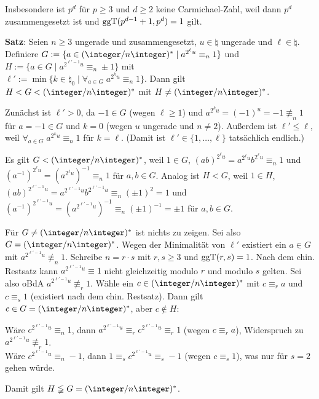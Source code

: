 Insbesondere ist $p^d$ für $p \ge 3$ und $d \ge 2$ keine Carmichael-Zahl, weil dann
$p^d$ zusammengesetzt ist und $\operatorname{ggT}(p^{d-1}+1, p^d) = 1$ gilt.

\linie
\pagebreak

\textbf{Satz}:
Seien $n \ge 3$ ungerade und zusammengesetzt, $u \in \natural$ ungerade und $\ell \in \natural$.\\
Definiere $G := \{a \in (\ZnZ)^\ast \;|\; a^{2^\ell u} \equiv_n 1\}$ und
$H := \{a \in G \;|\; a^{2^{\ell'-1} u} \equiv_n \pm 1\}$ mit\\
$\ell' := \min\{k \in \natural_0 \;|\; \forall_{a \in G}\; a^{2^k u} \equiv_n 1\}$.
Dann gilt $H < G < (\ZnZ)^\ast$ mit $H \not= (\ZnZ)^\ast$.

\begin{Beweis}
    Zunächst ist $\ell' > 0$, da $-1 \in G$ (wegen $\ell \ge 1$)
    und $a^{2^k u} = (-1)^u = -1 \not\equiv_n 1$ für $a = -1 \in G$ und $k = 0$
    (wegen $u$ ungerade und $n \not= 2$).
    Außerdem ist $\ell' \le \ell$, weil $\forall_{a \in G}\; a^{2^k u} \equiv_n 1$ für $k = \ell$.
    (Damit ist $\ell' \in \{1, \dotsc, \ell\}$ tatsächlich endlich.)

    Es gilt $G < (\ZnZ)^\ast$, weil $1 \in G$,
    $(ab)^{2^\ell u} = a^{2^\ell u} b^{2^\ell u} \equiv_n 1$ und
    $(a^{-1})^{2^\ell u} = (a^{2^\ell u})^{-1} \equiv_n 1$ für $a, b \in G$.
    Analog ist $H < G$, weil $1 \in H$,
    $(ab)^{2^{\ell'-1} u} = a^{2^{\ell'-1} u} b^{2^{\ell'-1} u} \equiv_n (\pm 1)^2 = 1$ und
    $(a^{-1})^{2^{\ell'-1} u} = (a^{2^{\ell'-1} u})^{-1} \equiv_n (\pm 1)^{-1} = \pm 1$ für
    $a, b \in G$.

    Für $G \not= (\ZnZ)^\ast$ ist nichts zu zeigen.
    Sei also $G = (\ZnZ)^\ast$.
    Wegen der Minimalität von $\ell'$ existiert ein $a \in G$ mit
    $a^{2^{\ell'-1} u} \not\equiv_n 1$.
    Schreibe $n = r \cdot s$ mit $r, s \ge 3$ und $\operatorname{ggT}(r, s) = 1$.
    Nach dem chin. Restsatz kann $a^{2^{\ell'-1} u} \equiv 1$
    nicht gleichzeitig modulo $r$ und modulo $s$ gelten.
    Sei also oBdA $a^{2^{\ell'-1} u} \not\equiv_r 1$.
    Wähle ein $c \in (\ZnZ)^\ast$ mit $c \equiv_r a$ und $c \equiv_s 1$
    (existiert nach dem chin. Restsatz).
    Dann gilt $c \in G = (\ZnZ)^\ast$, aber $c \notin H$:

    Wäre $c^{2^{\ell'-1} u} \equiv_n 1$, dann
    $a^{2^{\ell'-1} u} \equiv_r c^{2^{\ell'-1} u} \equiv_r 1$ (wegen $c \equiv_r a$),
    Widerspruch zu $a^{2^{\ell'-1} u} \not\equiv_r 1$.\\
    Wäre $c^{2^{\ell'-1} u} \equiv_n -1$, dann
    $1 \equiv_s c^{2^{\ell'-1} u} \equiv_s -1$ (wegen $c \equiv_s 1$),
    was nur für $s = 2$ gehen würde.

    Damit gilt $H \lneqq G = (\ZnZ)^\ast$.
\end{Beweis}


